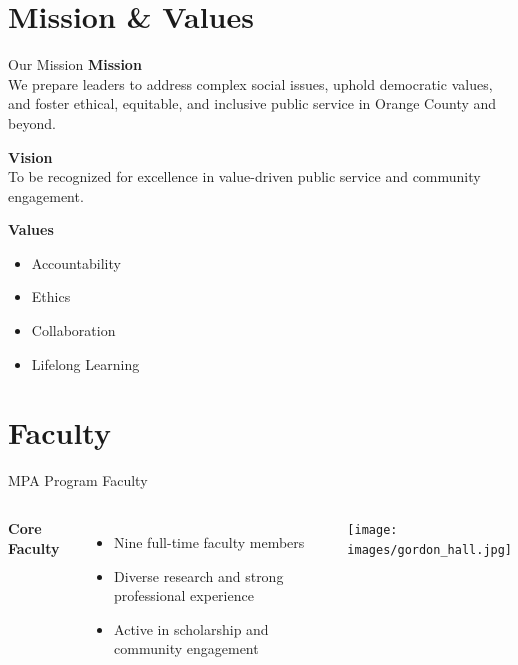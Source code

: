 \documentclass[10pt]{beamer}
\begin{document}
\section{Mission \& Values}
\begin{frame}{Our Mission}
\textbf{Mission}\\
We prepare leaders to address complex social issues, uphold democratic values, and foster ethical, equitable, and inclusive public service in Orange County and beyond.

\vspace{0.8em}
\textbf{Vision}\\
To be recognized for excellence in value-driven public service and community engagement.

\vspace{0.8em}
\textbf{Values}
\begin{itemize}
  \item Accountability \quad \item Ethics \quad \item Collaboration \quad \item Lifelong Learning
\end{itemize}
\end{frame}

\section{Faculty}
\begin{frame}{MPA Program Faculty}
\begin{columns}[T,onlytextwidth]
  \textbf{Core Faculty}
  \begin{itemize}
    \item Nine full-time faculty members
    \item Diverse research and strong professional experience
    \item Active in scholarship and community engagement
  \end{itemize}
  \texttt{[image: images/gordon\_hall.jpg]}
\end{columns}
\end{frame}
\end{document}
